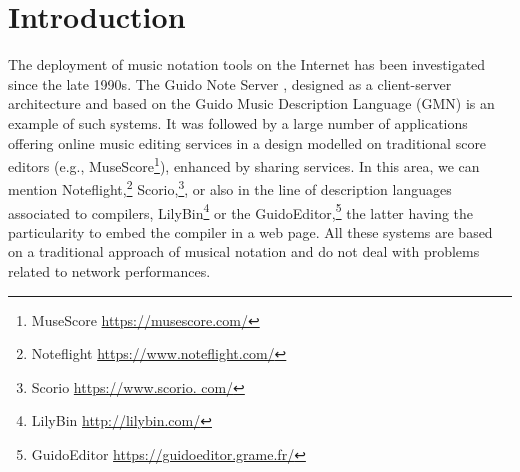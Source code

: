 \documentclass{article}
\title{\papertitle}
\begin{document}
%
\capstartfalse
\maketitle
\capstarttrue
%
\begin{abstract}
We present an online environment for the design of musical scores, also allowing for the embedding of signal processors and hence the publication of electronic works. This environment is part of the INScore project. Its latest version has been transcribed to WebAssembly/Javascript to provide in a web browser the same features as in its native counterpart: the diversity of music representations supported by INScore, the interaction capabilities and all the dynamic aspects of the score.

After some historical elements about distributed musical scores, we will provide some reminders about the INScore project and its associated description language. We will then describe the architecture of the system and the choices made for its portability to the Web. Then, we will present the extensions specific to the Javascript version and in particular the support of signal processing objects. 
Finally, we will show how INScore's communication system has been extended to allow online musical score control from a native version of INScore, paving the way for real-time performance on the web.

\end{abstract}


\section{Introduction}\label{sec:introduction}

The deployment of music notation tools on the Internet has been investigated since the late 1990s. The Guido Note Server \cite{renz98}, designed as a client-server architecture and based on the Guido Music Description Language \cite{hoos98} (GMN) is an example of such systems. It was followed by a large number of applications offering online music editing services in a design modelled on traditional score editors (e.g., MuseScore\footnote{MuseScore \url{https://musescore.com/}}), enhanced by sharing services. 
In this area, we can mention Noteflight,\footnote{Noteflight \url{https://www.noteflight.com/}} Scorio,\footnote{Scorio \url{https://www.scorio. com/}}, or also in the line of description languages associated to compilers, LilyBin\footnote{LilyBin \url{http://lilybin.com/}} or the GuidoEditor,\footnote{GuidoEditor \url{https://guidoeditor.grame.fr/}} the latter having the particularity to embed the compiler in a web page.
All these systems are based on a traditional approach of musical notation and do not deal with problems related to network performances.
\end{document}
